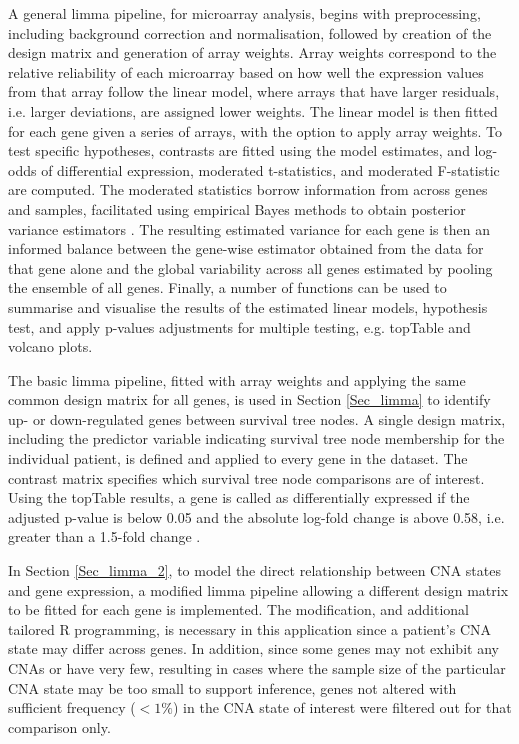 A general limma pipeline, for microarray analysis, begins with preprocessing, including background correction and normalisation, followed by creation of the design matrix and generation of array weights. Array weights correspond to the relative reliability of each microarray based on how well the expression values from that array follow the linear model, where arrays that have larger residuals, i.e. larger deviations, are assigned lower weights. The linear model is then fitted for each gene given a series of arrays, with the option to apply array weights. To test specific hypotheses, contrasts are fitted using the model estimates, and log-odds of differential expression, moderated t-statistics, and moderated F-statistic are computed. The moderated statistics borrow information from across genes and samples, facilitated using empirical Bayes methods to obtain posterior variance estimators \citep{pmid16646809}. The resulting estimated variance for each gene is then an informed balance between the gene-wise estimator obtained from the data for that gene alone and the global variability across all genes estimated by pooling the ensemble of all genes. Finally, a number of functions can be used to summarise and visualise the results of the estimated linear models, hypothesis test, and apply p-values adjustments for multiple testing, e.g. topTable and volcano plots. 

The basic limma pipeline, fitted with array weights and applying the same common design matrix for all genes, is used in Section \ref{Sec_limma} to identify up- or down-regulated genes between survival tree nodes. A single design matrix, including the predictor variable indicating survival tree node membership for the individual patient, is defined and applied to every gene in the dataset. The contrast matrix specifies which survival tree node comparisons are of interest. Using the topTable results, a gene is called as differentially expressed if the adjusted p-value is below 0.05 and the absolute log-fold change is above 0.58, i.e. greater than a 1.5-fold change \citep{pmid19176553}.  

In Section \ref{Sec_limma_2}, to model the direct relationship between CNA states and gene expression, a modified limma pipeline allowing a different design matrix to be fitted for each gene is implemented. The modification, and additional tailored R programming, is necessary in this application since a patient's CNA state may differ across genes. In addition, since some genes may not exhibit any CNAs or have very few, resulting in cases where the sample size of the particular CNA state may be too small to support inference, genes not altered with sufficient frequency ($< 1\%$) in the CNA state of interest were filtered out for that comparison only. 

